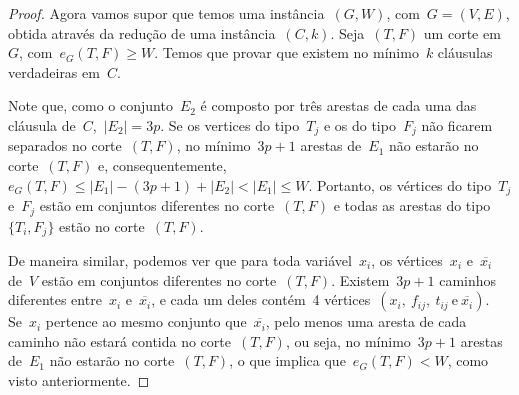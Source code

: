 \begin{proof}



		\bigskip
		\bigskip

		
		Agora vamos supor que temos uma instância~$(G,W)$,
		com~$G=(V,E)$, obtida através da redução de uma instância~$(C,k)$.
		Seja~$(T,F)$ um corte em~$G$,
		com~$e_G(T,F)\ge W$.
		Temos que provar que
		existem no mínimo~$k$ cláusulas verdadeiras em~$C$.

		Note que, como o conjunto~$E_2$ é composto por três arestas
		de cada uma das cláusula de~$C$,~${|E_2| = 3}p$.  
		Se os vertices do tipo~$T_j$ e os do tipo~$F_j$ não
		ficarem separados no corte~$(T,F)$,
		no mínimo~${3p+1}$ arestas de~$E_1$ não estarão
		no corte~$(T,F)$ e, 
		consequentemente,~${e_G(T,F)\le |E_1|-(3p+1)+|E_2|< |E_1| \le W}$. 
		Portanto, os vértices do tipo~$T_j$ e~$F_j$
		estão em conjuntos diferentes no corte~$(T,F)$
		e todas as arestas do tipo~$\{T_i,F_j\}$ estão no
		corte~$(T,F)$.

		De maneira similar, podemos ver que para toda 
		variável~$x_i$, os vértices~$x_i$ e~$\overline{x_i}$
		de~$V$ estão em conjuntos diferentes no corte~$(T,F)$.
		Existem~$3p+1$ caminhos diferentes entre~$x_i$
		e~$\overline{x_i}$, e cada um deles contém~4
		vértices~${(x_i,\ f_{ij},\ t_{ij} \ \text{e}\ \overline{x_i})}$.
		Se~$x_i$ pertence ao mesmo conjunto que~$\overline{x_i}$,
		pelo menos uma aresta de cada caminho não estará contida
		no corte~$(T,F)$, ou seja, no mínimo~$3p+1$ arestas
		de~$E_1$ não estarão no corte~$(T,F)$, o que
		implica que~${e_G(T,F)< W}$, como visto anteriormente.


\end{proof}

